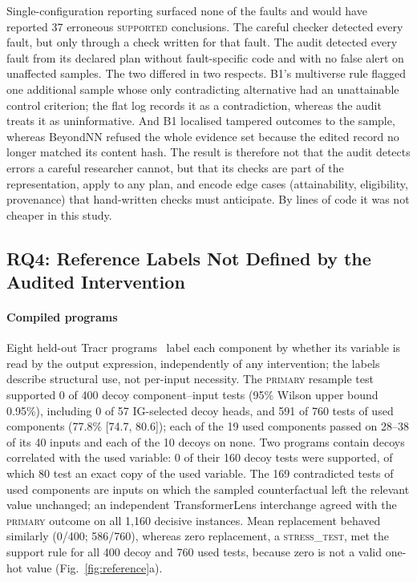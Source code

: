 Single-configuration reporting surfaced none of the faults and would have reported 37 erroneous \textsc{supported} conclusions. The careful checker detected every fault, but only through a check written for that fault. The audit detected every fault from its declared plan without fault-specific code and with no false alert on unaffected samples. The two differed in two respects. B1's multiverse rule flagged one additional sample whose only contradicting alternative had an unattainable control criterion; the flat log records it as a contradiction, whereas the audit treats it as uninformative. And B1 localised tampered outcomes to the sample, whereas BeyondNN refused the whole evidence set because the edited record no longer matched its content hash. The result is therefore not that the audit detects errors a careful researcher cannot, but that its checks are part of the representation, apply to any plan, and encode edge cases (attainability, eligibility, provenance) that hand-written checks must anticipate. By lines of code it was not cheaper in this study.



\subsection{RQ4: Reference Labels Not Defined by the Audited Intervention}
\label{sec:res-ref}

\paragraph*{Compiled programs}
Eight held-out Tracr programs~\cite{lindner2023tracr} label each component by whether its variable is read by the output expression, independently of any intervention; the labels describe structural use, not per-input necessity. The \textsc{primary} resample test supported 0 of 400 decoy component--input tests (95\% Wilson upper bound 0.95\%), including 0 of 57 IG-selected decoy heads, and 591 of 760 tests of used components (77.8\% [74.7, 80.6]); each of the 19 used components passed on 28--38 of its 40 inputs and each of the 10 decoys on none. Two programs contain decoys correlated with the used variable: 0 of their 160 decoy tests were supported, of which 80 test an exact copy of the used variable. The 169 contradicted tests of used components are inputs on which the sampled counterfactual left the relevant value unchanged; an independent TransformerLens interchange agreed with the \textsc{primary} outcome on all 1,160 decisive instances. Mean replacement behaved similarly (0/400; 586/760), whereas zero replacement, a \textsc{stress\_test}, met the support rule for all 400 decoy and 760 used tests, because zero is not a valid one-hot value (Fig.~\ref{fig:reference}a).

